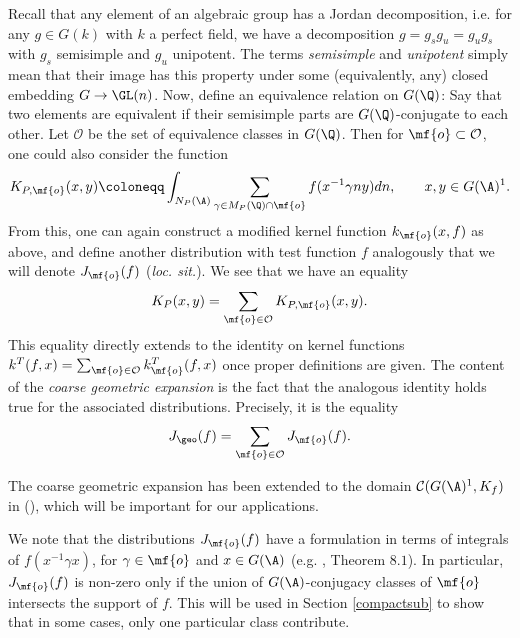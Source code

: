 Recall that any element of an algebraic group has a Jordan decomposition, i.e. for any $g\in G(k)$ with $k$ a perfect field, we have a decomposition $g=g_sg_u=g_ug_s$ with $g_s$ semisimple and $g_u$ unipotent. The terms \textit{semisimple} and \textit{unipotent} simply mean that their image has this property under some (equivalently, any) closed embedding $G\to \GL(n)$. Now, define an equivalence relation on $G(\Q)$: Say that two elements are equivalent if their semisimple parts are $G(\Q)$-conjugate to each other. Let $\mathcal{O}$ be the set of equivalence classes in $G(\Q)$. Then for $\mf{o}\subset \mathcal{O}$, one could also consider the function
\begin{align}\label{classkernel}
    K_{P,\mf{o}}(x,y)\coloneqq\int_{N_P(\A)} \sum_{\gamma\in M_P(\Q)\cap \mf{o}}f(x^{-1}\gamma n y) dn, \qquad x,y\in G(\A)^1.
\end{align}
From this, one can again construct a modified kernel function $k_{\mf{o}}(x,f)$ as above, and define another distribution with test function $f$ analogously that we will denote $J_\mf{o}(f)$ (\textit{loc. sit.}). We see that we have an equality
\begin{align*}
    K_P(x,y) = \sum_{\mf{o}\in\mathcal{O}}K_{P,\mf{o}}(x,y).
\end{align*}
This equality directly extends to the identity on kernel functions $k^T(f,x)=\sum_{\mf{o}\in \mathcal{O}}k^T_{\mf{o}}(f,x)$ once proper definitions are given. The content of the \emph{coarse geometric expansion} is the fact that the analogous identity holds true for the associated distributions. Precisely, it is the equality
\begin{align}\label{coarsegeom}
    J_{\geo}(f) = \sum_{\mf{o}\in\mathcal{O}}J_{\mf{o}}(f).
\end{align}

\noindent The coarse geometric expansion has been extended to the domain $\mathcal{C}(G(\A)^1,K_f)$ in (\cite{FL}), which will be important for our applications.

We note that the distributions $J_{\mf{o}}(f)$ have a formulation in terms of integrals of $f(x^{-1}\gamma x)$, for $\gamma\in\mf{o}$ and $x\in G(\A)$ (e.g. \cite{Arthur5}, Theorem $8.1$). In particular, $J_{\mf{o}}(f)$ is non-zero only if the union of $G(\A)$-conjugacy classes of $\mf{o}$ intersects the support of $f$. This will be used in Section \ref{compactsub} to show that in some cases, only one particular class contribute.

